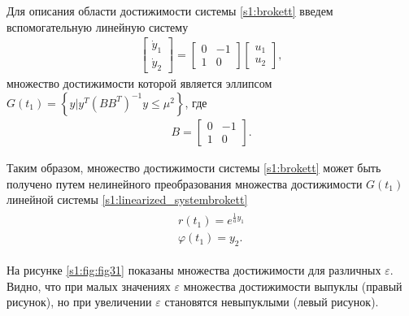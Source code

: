 \documentclass[../main.tex]{subfiles}
\begin{document}
Для описания области достижимости системы \eqref{s1:brokett} введем вспомогательную линейную систему
\begin{gather}\label{s1:linearized_systembrokett}
     \left[ {\begin{array}{*{20}{c}}
             {{{\dot y}_1}}\\
             {{{\dot y}_2}}
     \end{array}} \right] = \left[ {\begin{array}{*{20}{c}}
             0&{ - 1}\\
             1&0
     \end{array}} \right]\left[ {\begin{array}{*{20}{c}}
             {{u_1}}\\
             {{u_2}}
     \end{array}} \right],
\end{gather}
множество достижимости которой является эллипсом $ G(t_1) = \left\lbrace y | y^T \left( B B^T\right)  ^{-1} y \leqslant \mu^2 \right\rbrace  $, где 
\begin{gather*}
     B = \left[ {\begin{array}{*{20}{c}}
             0&{ - 1}\\
             1&0
     \end{array}} \right].
\end{gather*}
 
Таким образом, множество достижимости системы \eqref{s1:brokett} может быть получено путем нелинейного преобразования множества достижимости $ G(t_1) $ линейной системы \eqref{s1:linearized_systembrokett}
\begin{gather*}
	\begin{array}{l}
		r({t_1}) = {e^{ \frac{1}{a} y_1}}\\
		\varphi ({t_1}) =  y_2. 
	\end{array}
\end{gather*}

На рисунке  \ref{s1:fig:fig31} показаны множества достижимости для различных $ \varepsilon $.
Видно, что при малых значениях $\varepsilon$ множества достижимости выпуклы (правый рисунок), но при увеличении $\varepsilon $ становятся невыпуклыми (левый рисунок).
\end{document}
